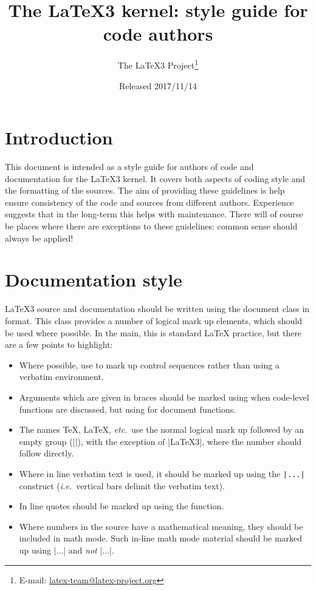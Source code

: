 \documentclass{l3doc}
\title{%
  The \LaTeX3 kernel: style guide for code authors%
}
\author{%
  The \LaTeX3 Project\thanks
    {%
      E-mail:
      \href{mailto:latex-team@latex-project.org}%
        {latex-team@latex-project.org}%
    }%
}
\date{Released 2017/11/14}
\begin{document}
\maketitle

\tableofcontents

\section{Introduction}

This document is intended as a style guide for authors of code and
documentation for the \LaTeX3 kernel. It covers both aspects of coding
style and the formatting of the sources. The aim of providing these
guidelines is help ensure consistency of the code and sources from
different authors. Experience suggests that in the long-term this helps
with maintenance. There will of course be places where there are
exceptions to these guidelines: common sense should always be
applied!

\section{Documentation style}

\LaTeX3 source and documentation should be written using the document
class  in  format. This class provides a number
of logical mark up elements, which should be used where possible.
In the main, this is standard \LaTeX{} practice, but there are a
few points to highlight:
\begin{itemize}
  \item
    Where possible, use  to mark up control sequences
    rather than using a verbatim environment.
  \item
    Arguments which are given in braces should be marked using
     when code-level functions are discussed, but using
     for document functions.
  \item
    The names \TeX{}, \LaTeX{}, \emph{etc}.\ use the normal logical mark
    up followed by an empty group (|{}|), with the exception of |\LaTeX3|,
    where the number should follow directly.
  \item
    Where in line verbatim text is used, it should be marked up
    using the \verb=|...|= construct (\emph{i.e.}~vertical bars delimit
    the verbatim text).
  \item In line quotes should be marked up using the 
    function.
  \item
    Where numbers in the source have a mathematical meaning,
    they should be included in math mode. Such in-line math mode
    material should be marked up using |$...$| and  \emph{not}
    |\(...\)|.
\end{itemize}
\end{document}
